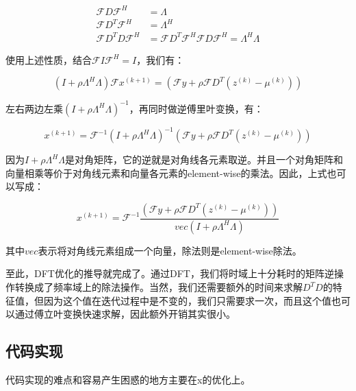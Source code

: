 \documentclass[10pt]{report}
\begin{document}
\begin{equation}
\begin{aligned}
\mathcal{F}D\mathcal{F}^H &= \Lambda \\
\mathcal{F}D^T\mathcal{F}^H &= \Lambda^H \\	
\mathcal{F}D^TD\mathcal{F}^H &= \mathcal{F}D^T\mathcal{F}^H\mathcal{F}D\mathcal{F}^H = \Lambda^H\Lambda
\end{aligned}
\end{equation}

使用上述性质，结合$\mathcal{F}I\mathcal{F}^H = I$，我们有：

\begin{equation}
\left( I +\rho \Lambda^H\Lambda \right) \mathcal{F} x ^{(k+1)} = \left( \mathcal{F}y + \rho \mathcal{F}D^T\left( z ^{(k)}- \mu ^{(k)}\right) \right)	
\end{equation}

左右两边左乘$\left( I +\rho \Lambda^H\Lambda \right)^{-1}$，再同时做逆傅里叶变换，有：

\begin{equation}
x ^{(k+1)} = \mathcal{F}^{-1} \left( I +\rho \Lambda^H\Lambda \right)^{-1} \left( \mathcal{F}y + \rho \mathcal{F}D^T\left( z ^{(k)}- \mu ^{(k)}\right) \right) 	
\end{equation}

因为$I +\rho \Lambda^H\Lambda$是对角矩阵，它的逆就是对角线各元素取逆。并且一个对角矩阵和向量相乘等价于对角线元素和向量各元素的element-wise的乘法。因此，上式也可以写成：

\begin{equation}
 x ^{(k+1)} = \mathcal{F}^{-1} \frac{\left( \mathcal{F}y + \rho \mathcal{F}D^T\left( z ^{(k)}- \mu ^{(k)}\right) \right)}{vec\left( I +\rho \Lambda^H\Lambda \right)}
\label{eq-1d-admm-dft}
\end{equation}

其中$vec$表示将对角线元素组成一个向量，除法则是element-wise除法。

至此，DFT优化的推导就完成了。通过DFT，我们将时域上十分耗时的矩阵逆操作转换成了频率域上的除法操作。当然，我们还需要额外的时间来求解$D^TD$的特征值，但因为这个值在迭代过程中是不变的，我们只需要求一次，而且这个值也可以通过傅立叶变换快速求解，因此额外开销其实很小。

\subsection{代码实现}

代码实现的难点和容易产生困惑的地方主要在x的优化上。
\end{document}
